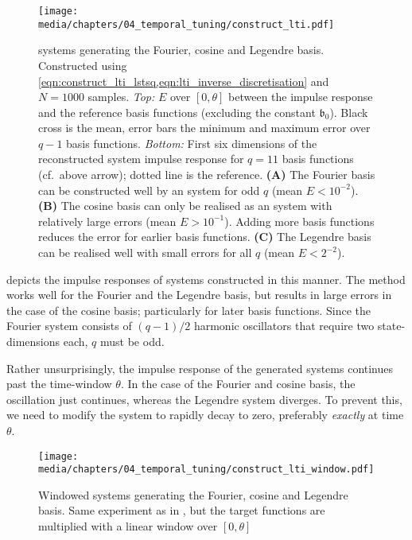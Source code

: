 \begin{figure}
	\centering
	\texttt{[image: media/chapters/04\_temporal\_tuning/construct\_lti.pdf]}
	\caption[LTI systems generating the Fourier, cosine and Legendre basis]{\LTI systems generating the Fourier, cosine and Legendre basis.
	Constructed using \cref{eqn:construct_lti_lstsq,eqn:lti_inverse_discretisation} and $N = 1000$ samples.
	\emph{Top:} \NRMSE $E$ over $[0, \theta]$ between the \LTI impulse response and the reference basis functions (excluding the constant $\mathfrak{b}_0$). Black cross is the mean, error bars the minimum and maximum error over $q - 1$ basis functions.
	\emph{Bottom:} First six dimensions of the reconstructed \LTI system impulse response for $q = 11$ basis functions (cf.~above arrow); dotted line is the reference.
	\textbf{(A)} The Fourier basis can be constructed well by an \LTI system for odd $q$ (mean $E < 10^{-2}$).
	\textbf{(B)} The cosine basis can only be realised as an \LTI system with relatively large errors (mean $E > 10^{-1}$). Adding more basis functions reduces the error for earlier basis functions.
	\textbf{(C)} The Legendre basis can be realised well with small errors for all $q$ (mean $E < 2^{-2}$).
	}
	\label{fig:construct_lti}
\end{figure}

 depicts the impulse responses of \LTI systems constructed in this manner.
The method works well for the Fourier and the Legendre basis, but results in large errors in the case of the cosine basis; particularly for later basis functions.
Since the Fourier system consists of $(q - 1) / 2$ harmonic oscillators that require two state-dimensions each, $q$ must be odd.

Rather unsurprisingly, the impulse response of the generated \LTI systems continues past the time-window $\theta$.
In the case of the Fourier and cosine basis, the oscillation just continues, whereas the Legendre system diverges.
To prevent this, we need to modify the system to rapidly decay to zero, preferably \emph{exactly} at time $\theta$.

\begin{figure}
	\centering
	\texttt{[image: media/chapters/04\_temporal\_tuning/construct\_lti\_window.pdf]}
	\caption[Windowed LTI systems generating the Fourier, cosine and Legendre basis]{
	Windowed \LTI systems generating the Fourier, cosine and Legendre basis.
	Same experiment as in , but the target functions are multiplied with a linear window over $[0, \theta]$
	}
	\label{fig:construct_lti_window}
\end{figure}

